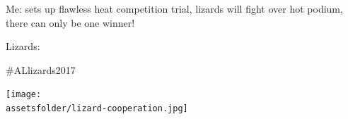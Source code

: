\documentclass{beamer}
\newcommand{\assetsfolder}{./assets}
\newcommand{\researchfolder}{$HOME/rsc/axelrod-moran}
\begin{document}
    \begin{frame}
        \begin{center}
            \begin{tcolorbox}[colback=twitter,colframe=twitter!40!black,title=
                    \href{https://twitter.com/kirstyjean/status/870415613746962432}
                    {@kirstyjean} (2 Jun 2017):
]
                    Me: sets up flawless heat competition trial, lizards will
                    fight over hot podium, there can only be one winner!

                    Lizards:

                    \#ALlizards2017
           \end{tcolorbox}
        \end{center}
        \begin{center}
            \pause
            \texttt{[image: \\assetsfolder/lizard-cooperation.jpg]}
        \end{center}

    \end{frame}

    \begin{frame}
        \begin{center}
            \scalebox{.6}{}
        \end{center}
    \end{frame}
\end{document}
